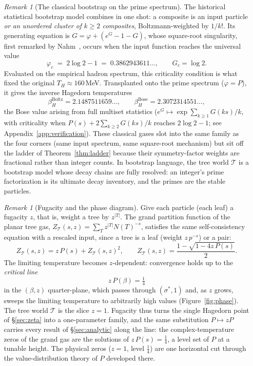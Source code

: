 \documentclass[11pt]{article}
\newcommand{\cT}{\mathcal{T}}   %
\numberwithin{equation}{section}
\theoremstyle{plain}
\theoremstyle{definition}
\theoremstyle{remark}
\newtheorem{remark}[theorem]{Remark}
\begin{document}
\begin{remark}[The classical bootstrap on the prime spectrum]\label{rem:bootstrap}
The historical statistical bootstrap model combines in one shot: a composite is an
input particle \emph{or an unordered cluster of $k \ge 2$ composites},
Boltzmann-weighted by $1/k!$. Its generating equation is
$G = \varphi + (e^{G} - 1 - G)$, whose square-root
singularity, first remarked by Nahm~\cite{nahm}, occurs when the input function
reaches the universal value
\[
\varphi_c \;=\; 2\log 2 - 1 \;=\; 0.3862943611\dots,
\qquad G_c = \log 2 .
\]
Evaluated on the empirical hadron spectrum, this criticality condition is what fixed
the original $T_H \approx 160$\,MeV. Transplanted onto the prime spectrum
($\varphi = P$), it gives the inverse Hagedorn temperatures
\[
\beta_H^{\mathrm{Boltz}} = 2.1487511659\dots,
\qquad
\beta_H^{\mathrm{Bose}} = 2.3072314551\dots,
\]
the Bose value arising from full multiset statistics
($e^{G} \mapsto \exp\sum_{k\ge1} G(ks)/k$, with criticality when
$P(s) + 2\sum_{k \ge 2} G(ks)/k$ reaches $2\log2 - 1$; see
Appendix~\ref{app:verification}). These classical gases
slot into the same family as the four corners (same input spectrum, same
square-root mechanism) but sit off the ladder of Theorem~\ref{thm:ladder} because
their symmetry-factor weights are fractional rather than integer counts. In bootstrap
language, the tree world $\cT$ is a bootstrap model whose decay chains are fully
resolved: an integer's prime factorization is its ultimate decay inventory, and the
primes are the stable particles.
\end{remark}

\begin{remark}[Fugacity and the phase diagram]\label{rem:fugacity}
Give each particle (each leaf) a fugacity $z$, that is, weight a tree by
$z^{|T|}$. The grand partition function of the planar tree gas,
$Z_\cT(s, z) = \sum_T z^{|T|} N(T)^{-s}$, satisfies the same self-consistency
equation with a rescaled input, since a tree is a leaf (weight $z\,p^{-s}$) or a pair:
\[
Z_\cT(s, z) = z\,P(s) + Z_\cT(s, z)^2,
\qquad
Z_\cT(s, z) = \frac{1 - \sqrt{1 - 4z\,P(s)}}{2}.
\]
The limiting temperature becomes $z$-dependent: convergence holds up to the
\emph{critical line}
\[
z\, P(\beta) = \tfrac14
\]
in the $(\beta, z)$ quarter-plane, which passes through $(\sigma^{*}, 1)$ and, as $z$
grows, sweeps the limiting temperature to arbitrarily high values (Figure~\ref{fig:phase}).
The tree world $\cT$ is the slice $z = 1$. Fugacity thus turns the single Hagedorn
point of \S\ref{sec:zeta} into a one-parameter family, and the same substitution
$P \mapsto zP$ carries every result of \S\ref{sec:analytic} along the line: the
complex-temperature zeros of the grand gas are the solutions of $z\,P(s) = \tfrac14$,
a level set of $P$ at a tunable height. The physical zeros ($z=1$, level $\tfrac14$)
are one horizontal cut through the value-distribution theory of $P$ developed there.
\end{remark}
\end{document}
